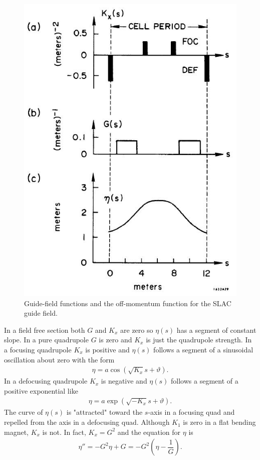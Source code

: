 \begin{figure}[!htb]
	\centering
	\includegraphics[width=0.8\linewidth]{./Figuras/fig29.jpeg}
	\caption{Guide-field functions and the off-momentum function for the SLAC guide field.}
	\label{fig:fig29}
\end{figure}
In a field free section both $G$ and $K_x$ are zero so $\eta(s)$ has a segment of constant
slope. In a pure quadrupole $G$ is zero and $K_x$ is just the quadrupole strength. In
a focusing quadrupole $K_x$ is positive and $\eta(s)$ follows a segment of a sinusoidal
oscillation about zero with the form
\begin{align*}
	\eta = a \cos(\sqrt{K_x}s + \vartheta).
\end{align*}
In a defocusing quadrupole $K_x$ is negative and $\eta(s)$ follows a segment of a positive
exponential like
\begin{align*}
	\eta = a \exp(\sqrt{-K_x}s+\vartheta).
\end{align*}
The curve of $\eta(s)$ is "attracted" toward the $s$-axis in a focusing quad and repelled
from the axis in a defocusing quad.
Although $K_1$ is zero in a flat bending magnet, $K_x$ is not. In fact, $K_x = G^2$ and
the equation for $\eta$ is
\begin{align}
	\eta'' = -G^2\eta + G = -G^2\left( \eta - \dfrac{1}{G} \right).
\end{align}
